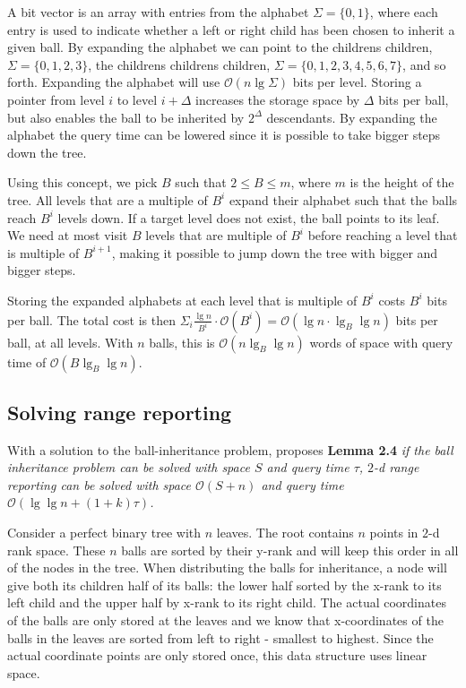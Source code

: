 A bit vector is an array with entries from the alphabet $\Sigma = \{0,1\}$, where each entry is used to indicate whether a left or right child has been chosen to inherit a given ball. By expanding the alphabet we can point to the childrens children, $\Sigma = \{0,1,2,3\}$, the childrens childrens children, $\Sigma = \{0,1,2,3,4,5,6,7\}$, and so forth. Expanding the alphabet will use $\mathcal{O}(n \lg \Sigma)$ bits per level. Storing a pointer from level $i$ to level $i+\Delta$ increases the storage space by $\Delta$ bits per ball, but also enables the ball to be inherited by $2^\Delta$ descendants. By expanding the alphabet the query time can be lowered since it is possible to take bigger steps down the tree. 

Using this concept, we pick $B$ such that $2 \leq B \leq m$, where $m$ is the height of the tree. All levels that are a multiple of $B^i$ expand their alphabet such that the balls reach $B^i$ levels down. If a target level does not exist, the ball points to its leaf. We need at most visit $B$ levels that are multiple of $B^i$ before reaching a level that is multiple of $B^{i+1}$, making it possible to jump down the tree with bigger and bigger steps.

Storing the expanded alphabets at each level that is multiple of $B^i$ costs $B^i$ bits per ball. The total cost is then $\Sigma_i \frac{\lg n}{B^i} \cdot \mathcal{O}(B^i) = \mathcal{O}(\lg n \cdot \lg_B \lg n)$ bits per ball, at all levels. With $n$ balls, this is $\mathcal{O}(n \lg_B \lg n)$ words of space with query time of $\mathcal{O}(B \lg_B \lg n)$. 


\subsection{Solving range reporting}
With a solution to the ball-inheritance problem, \citet{chanetal} proposes \textbf{Lemma 2.4} \emph{if the ball inheritance problem can be solved with space $S$ and query time $\tau$, $2$-d range reporting can be solved with space $\mathcal{O}(S+n)$ and query time $\mathcal{O}(\lg \lg n + (1+k) \tau)$.}

Consider a perfect binary tree with $n$ leaves. The root contains $n$ points in $2$-d rank space. These $n$ balls are sorted by their y-rank and will keep this order in all of the nodes in the tree. When distributing the balls for inheritance, a node will give both its children half of its balls: the lower half sorted by the x-rank to its left child and the upper half by x-rank to its right child. The actual coordinates of the balls are only stored at the leaves and we know that x-coordinates of the balls in the leaves are sorted from left to right - smallest to highest. Since the actual coordinate points are only stored once, this data structure uses linear space.

